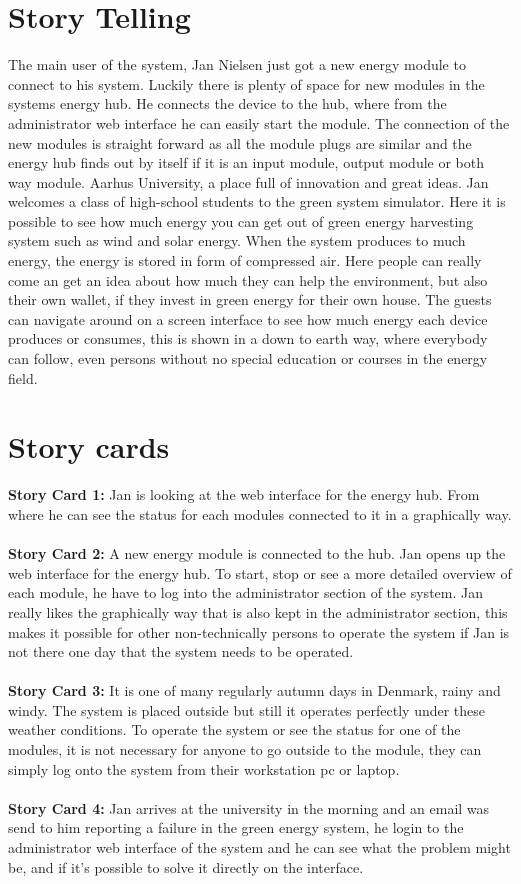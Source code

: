 \section{Story Telling}
The main user of the system, Jan Nielsen just got a new energy module to connect to his system. Luckily there is plenty of space
for new modules in the systems energy hub. He connects the device to the hub, where from the administrator web interface he can easily start the module.
The connection of the new modules is straight forward as all the module plugs are similar and the energy hub finds out by itself
if it is an input module, output module or both way module.
\newline
Aarhus University, a place full of innovation and great ideas. Jan welcomes a class of high-school students to the green system simulator. Here it
is possible to see how much energy you can get out of green energy harvesting system
such as wind and solar energy. When the system produces to much energy, the 
energy is stored in form of compressed air. Here people can really come an get an idea about 
how much they can help the environment, but also their own wallet, if they invest in green energy for their own house.
The guests can navigate around on a screen interface to see how much energy each device 
produces or consumes, this is shown in a down to earth way, where everybody can follow, 
even persons without no special education or courses in the energy field.

\section{Story cards}
\textbf{Story Card 1:} Jan is looking at the web interface for the energy hub. From where he can see the status for each modules connected to it
in a graphically way.\\\\
\textbf{Story Card 2:} A new energy module is connected to the hub. Jan opens up the web interface for the energy hub. 
To start, stop or see a more detailed overview of each module, he have to log into the administrator section of the system.
Jan really likes the graphically way that is also kept in the administrator section, this makes it possible for other
non-technically persons to operate the system if Jan is not there one day that the system needs to be operated.\\\\
\textbf{Story Card 3:} It is one of many regularly autumn days in Denmark, rainy and windy. The system is placed outside
but still it operates perfectly under these weather conditions. To operate the system or see the status for one of the modules,
it is not necessary for anyone to go outside to the module, they can simply log onto the system from their workstation pc or laptop.\\\\
\textbf{Story Card 4:} Jan arrives at the university in the morning and an email was send to him reporting a failure in the green energy system, he login to the administrator web interface of the system and he can see what the problem might be, and if it's possible to solve it directly on the interface.
\newpage
